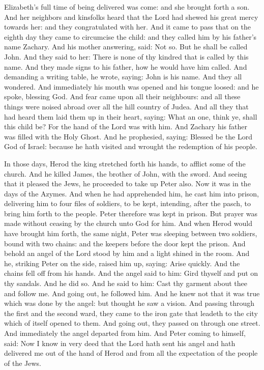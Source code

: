 \begin{multicols}{2}

Elizabeth's full time of being delivered was come: and she
brought forth a son.
And her neighbors and kinsfolks heard that the Lord had shewed his
great mercy towards her: and they congratulated with her.
And it came to pass that on the eighth day they came to circumcise
the child: and they called him by his father's name Zachary.
And his mother answering, said: Not so. But he shall be called
John.
And they said to her: There is none of thy kindred that is called
by this name.
And they made signs to his father, how he would have him called.
And demanding a writing table, he wrote, saying: John is his name.
And they all wondered.
And immediately his mouth was opened and his tongue loosed: and he
spoke, blessing God.
And fear came upon all their neighbours: and all these things were
noised abroad over all the hill country of Judea.
And all they that had heard them laid them up in their heart,
saying: What an one, think ye, shall this child be? For the hand of the
Lord was with him.
And Zachary his father was filled with the Holy Ghost. And he
prophesied, saying:
Blessed be the Lord God of Israel: because he hath visited and
wrought the redemption of his people.



\bigskip





In those days, Herod the king stretched forth his hands, to
afflict some of the church.
And he killed James, the brother of John, with the sword.
And seeing that it pleased the Jews, he proceeded to take up Peter
also. Now it was in the days of the Azymes.
And when he had apprehended him, he cast him into prison,
delivering him to four files of soldiers, to be kept, intending, after
the pasch, to bring him forth to the people.
Peter therefore was kept in prison. But prayer was made without
ceasing by the church unto God for him.
And when Herod would have brought him forth, the same night, Peter
was sleeping between two soldiers, bound with two chains: and the
keepers before the door kept the prison.
And behold an angel of the Lord stood by him and a light shined in
the room. And he, striking Peter on the side, raised him up, saying:
Arise quickly. And the chains fell off from his hands.
And the angel said to him: Gird thyself and put on thy sandals.
And he did so. And he said to him: Cast thy garment about thee and
follow me.
And going out, he followed him. And he knew not that it was true
which was done by the angel: but thought he saw a vision.
And passing through the first and the second ward, they came to
the iron gate that leadeth to the city which of itself opened to them.
And going out, they passed on through one street. And immediately the
angel departed from him.
And Peter coming to himself, said: Now I know in very deed that
the Lord hath sent his angel and hath delivered me out of the hand of
Herod and from all the expectation of the people of the Jews.


\end{multicols}
